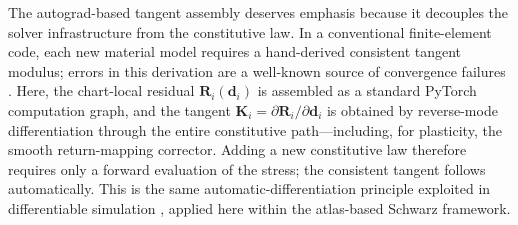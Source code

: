 \documentclass[sort&compress]{svjour3} %
\begin{document}
\begin{remark}
\label{rem:tangent_modularity}
The autograd-based tangent assembly deserves emphasis because it decouples the solver infrastructure from the constitutive law. In a conventional finite-element code, each new material model requires a hand-derived consistent tangent modulus; errors in this derivation are a well-known source of convergence failures \citep{simo_computational_1998}. Here, the chart-local residual $\mathbf{R}_i(\mathbf{d}_i)$ is assembled as a standard PyTorch computation graph, and the tangent $\mathbf{K}_i = \partial\mathbf{R}_i/\partial\mathbf{d}_i$ is obtained by reverse-mode differentiation through the entire constitutive path---including, for plasticity, the smooth return-mapping corrector. Adding a new constitutive law therefore requires only a forward evaluation of the stress; the consistent tangent follows automatically. This is the same automatic-differentiation principle exploited in differentiable simulation \citep{hu_difftaichi_2020}, applied here within the atlas-based Schwarz framework.
\end{remark}
\end{document}
